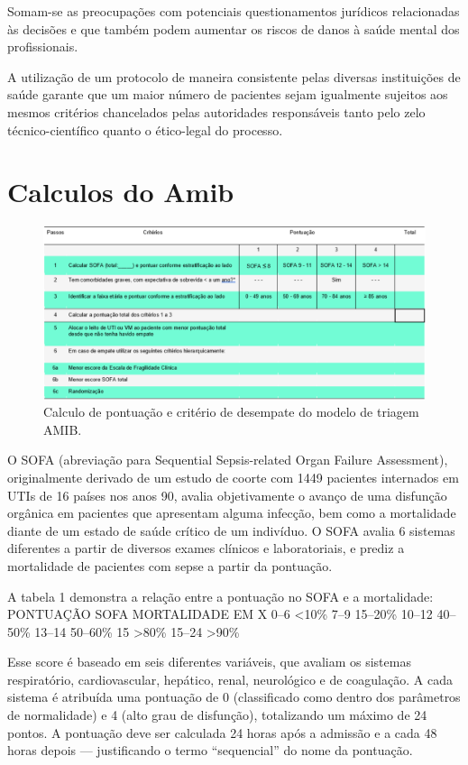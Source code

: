 \documentclass[12pt]{article}
\begin{document}
Somam-se as preocupações com potenciais questionamentos jurídicos relacionadas às decisões e que também podem aumentar os riscos de danos à saúde mental dos profissionais.

A utilização de um protocolo de maneira consistente pelas diversas instituições de saúde garante que um maior número de pacientes sejam igualmente sujeitos aos mesmos critérios chancelados pelas autoridades responsáveis tanto pelo zelo técnico-científico quanto o ético-legal do processo.


\section{Calculos do Amib }

\begin{figure}[!htb]
    \centering
    \includegraphics[scale=0.9]{img/Tabela de pontuacoes e criterios.png}
    \centering
    \caption{Calculo de pontuação e critério de desempate do modelo de triagem AMIB.}
    \label{subexpressao}
\end{figure}

O SOFA (abreviação para Sequential Sepsis-related Organ Failure Assessment), originalmente derivado de um estudo de coorte com 1449 pacientes internados em UTIs de 16 países nos anos 90, avalia objetivamente o avanço de uma disfunção orgânica em pacientes que apresentam alguma infecção, bem como a mortalidade diante de um estado de saúde crítico de um indivíduo.
O SOFA avalia 6 sistemas diferentes a partir de diversos exames clínicos e laboratoriais, e prediz a mortalidade de pacientes com sepse a partir da pontuação.

A tabela 1 demonstra a relação entre a pontuação no SOFA e a mortalidade:
PONTUAÇÃO SOFA	MORTALIDADE EM X%
0–6	<10\%
7–9	15–20\%
10–12	40–50\%
13–14	50–60\%
15	>80\%
15–24	>90\%

Esse score é baseado em seis diferentes variáveis, que avaliam os sistemas respiratório, cardiovascular, hepático, renal, neurológico e de coagulação. A cada sistema é atribuída uma pontuação de 0 (classificado como dentro dos parâmetros de normalidade) e 4 (alto grau de disfunção), totalizando um máximo de 24 pontos. A pontuação deve ser calculada 24 horas após a admissão e a cada 48 horas depois — justificando o termo “sequencial” do nome da pontuação.
\end{document}
